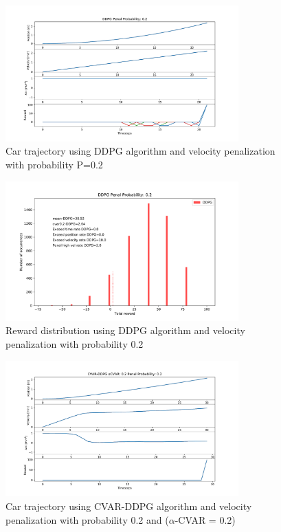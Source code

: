 \begin{figure}[ht]
        \centering
        \includegraphics[width=0.8\textwidth]{images/DDPG/Trajectory_DDPG_ppenal02.pdf}
        \caption{Car trajectory using DDPG algorithm and velocity penalization with
        probability P=0.2}
        \label{traj_ddpg_probpenal0.2}
    
\end{figure}
\begin{figure}[ht]
        \centering
        \includegraphics[width=0.8\textwidth]{images/DDPG/Rewards_DDPG_ppenal02.pdf}
        \caption{Reward distribution using DDPG algorithm and velocity penalization with probability 0.2}
        \label{rew_ddpg_probpenal0.2}
    
\end{figure}


\begin{figure}[ht]
        \centering
        \includegraphics[width=0.8\textwidth]{images/CVAR/Trajectory_CVAR_ppenal02.pdf}
        \caption{Car trajectory using CVAR-DDPG algorithm and velocity penalization with probability 0.2 and ($\alpha$-CVAR = 0.2)}
        \label{traj_cvar_ddpg_probpenal0.2_cvar0.2}
    
\end{figure}

